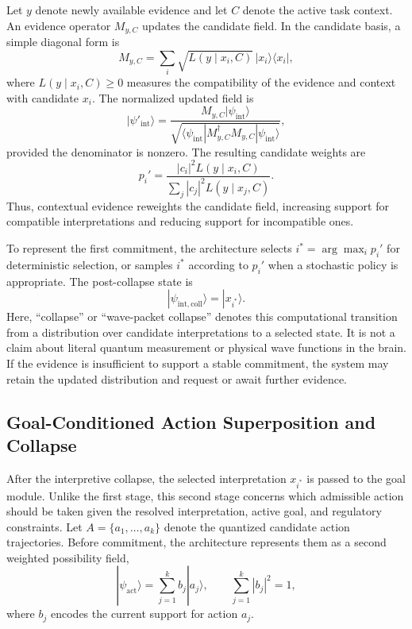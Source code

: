 \documentclass[10pt,journal,compsoc]{IEEEtran}
\begin{document}
Let $y$ denote newly available evidence and let $C$ denote the active task context. An evidence operator $M_{y,C}$ updates the candidate field. In the candidate basis, a simple diagonal form is
\[
M_{y,C} = \sum_i \sqrt{L(y\mid x_i,C)}\,|x_i\rangle\langle x_i|,
\]
where $L(y\mid x_i,C) \geq 0$ measures the compatibility of the evidence and context with candidate $x_i$. The normalized updated field is
\[
|\psi'_{\mathrm{int}}\rangle =
\frac{M_{y,C}|\psi_{\mathrm{int}}\rangle}
{\sqrt{\langle\psi_{\mathrm{int}}|M_{y,C}^{\dagger}M_{y,C}|\psi_{\mathrm{int}}\rangle}},
\]
provided the denominator is nonzero. The resulting candidate weights are
\[
p_i' = \frac{|c_i|^2 L(y\mid x_i,C)}
{\sum_j |c_j|^2 L(y\mid x_j,C)}.
\]
Thus, contextual evidence reweights the candidate field, increasing support for compatible interpretations and reducing support for incompatible ones.

To represent the first commitment, the architecture selects $i^{\ast}=\arg\max_i p_i'$ for deterministic selection, or samples $i^{\ast}$ according to $p_i'$ when a stochastic policy is appropriate. The post-collapse state is
\[
|\psi_{\mathrm{int,coll}}\rangle = |x_{i^{\ast}}\rangle.
\]
Here, ``collapse'' or ``wave-packet collapse'' denotes this computational transition from a distribution over candidate interpretations to a selected state. It is not a claim about literal quantum measurement or physical wave functions in the brain. If the evidence is insufficient to support a stable commitment, the system may retain the updated distribution and request or await further evidence.

\subsection{Goal-Conditioned Action Superposition and Collapse}

After the interpretive collapse, the selected interpretation $x_{i^{\ast}}$ is passed to the goal module. Unlike the first stage, this second stage concerns which admissible action should be taken given the resolved interpretation, active goal, and regulatory constraints. Let $A=\{a_1,\ldots,a_k\}$ denote the quantized candidate action trajectories. Before commitment, the architecture represents them as a second weighted possibility field,
\[
|\psi_{\mathrm{act}}\rangle = \sum_{j=1}^{k} b_j |a_j\rangle,
\qquad \sum_{j=1}^{k}|b_j|^2=1,
\]
where $b_j$ encodes the current support for action $a_j$.
\end{document}
